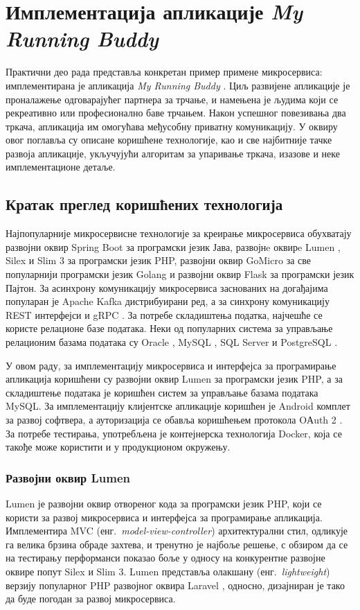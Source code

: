 \documentclass[12pt,oneside]{memoir}
\begin{document}
\chapter{Имплементација апликације \textit{My Running Buddy}}\label{prakticnideo}
Практични део рада представља конкретан пример примене микросервиса: имплементирана је апликација \textit{My Running Buddy} \cite{implementacija}. Циљ развијене апликације је проналажење одговарајућег партнера за трчање, и намењена је људима који се рекреативно или професионално баве трчањем. Након успешног повезивања два тркача, апликација им омогућава међусобну приватну комуникацију. У оквиру овог поглавља су описане коришћене технологије, као и све најбитније тачке развоја апликације, укључујући алгоритам за упаривање тркача, изазове и неке имплементационе детаље.

\section{Кратак преглед коришћених технологија}
Најпопуларније микросервисне технологије за креирање микросервиса обухватају развојни оквир Spring Boot \cite{SpringBoot} за програмски језик Јава, развојнe оквирe Lumen \cite{Lumen}, Silex \cite{Silex} и Slim 3 \cite{Slim3} за програмски језик PHP, развојни оквир GoMicro \cite{GoMicro} за све популарнији програмски језик Golang и развојни оквир Flask \cite{Flask} за програмски језик Пајтон. За асинхрону комуникацију микросервиса заснованих на догађајима популаран је Apache Kafka \cite{Kafka} дистрибуирани ред, а за синхрону комуникацију REST интерфејси и gRPC \cite{gRPC}. За потребе складиштења податка, најчешће се користе релационе базе података. Неки од популарних система за управљање релационим базама података су Oracle \cite{oracledbms}, MySQL \cite{mysql}, SQL Server \cite{sqlserver} и PostgreSQL \cite{postgresql}.

У овом раду, за имплементацију микросервиса и интерфејса за програмирање апликација коришћени су развојни оквир Lumen за програмски језик PHP, а за складиштење података је коришћен систем за управљање базама података MySQL. За имплементацију клијентске апликације коришћен је Android комплет за развој софтвера, а ауторизација се обавља коришћењем протокола OАuth 2 \cite{MasteringOAuth2}. За потребе тестирања, употребљена је контејнерска технологија Docker, која се такође може користити и у продукционом окружењу.

\subsection{Развојни оквир Lumen}
Lumen је развојни оквир отвореног кода за програмски језик PHP, који се користи за развој микросервиса и интерфејса за програмирање апликација. Имплементира MVC (енг.~\textit{model-view-controller}) архитектурални стил, одликује га велика брзина обраде захтева, и тренутно је најбоље решење, с обзиром да се на тестирању перформанси показао боље у односу на конкурентне развојне оквире попут Silex и Slim 3. Lumen представља олакшану (енг.~\textit{lightweight}) верзију популарног PHP развојног оквира Laravel \cite{Laravel}, односно, дизајниран је тако да буде погодан за развој микросервиса.
\end{document}
